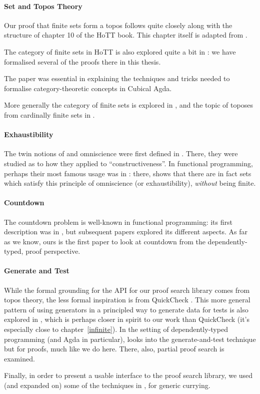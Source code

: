 \paragraph{Set and Topos Theory}
Our proof that finite sets form a topos follows quite closely along with the
structure of chapter 10 of the HoTT book.
This chapter itself is adapted from \citet{rijkeSetsHomotopyType2015}.

The category of finite sets in HoTT is also explored quite a bit in
\citet{yorgeyCombinatorialSpeciesLabelled2014}: we have formalised several of
the proofs there in this thesis.

The paper \citet{iversenUnivalentCategoriesFormalization2018} was essential in
explaining the techniques and tricks needed to formalise category-theoretic
concepts in Cubical Agda.

More generally the category of finite sets is explored in
\citet{solovevCategoryFiniteSets1983}, and the topic of toposes from cardinally
finite sets in \citet{henryToposesGeneratedCardinal2018}.
\paragraph{Exhaustibility}
The twin notions of and omniscience were first defined in
\citet{bishopFoundationsConstructiveAnalysis1967}.
There, they were studied as to how they applied to ``constructiveness''.
In functional programming, perhaps their most famous usage was in
\citet{escardoInfiniteSetsThat2013}: there,
\citeauthor{escardoInfiniteSetsThat2013} shows that there are in fact sets which
satisfy this principle of omniscience (or exhaustibility), \emph{without} being
finite.
\paragraph{Countdown}
The countdown problem is well-known in functional programming: its first
description was in \citet{huttonCountdownProblem2002}, but subsequent papers
\citep{birdCountdownCaseStudy2005, birdFunctionalPearlTrouble2003}
explored its different aspects.
As far as we know, ours is the first paper to look at countdown from the
dependently-typed, proof perspective.
\paragraph{Generate and Test}
While the formal grounding for the API for our proof search library comes from
topos theory, the less formal inspiration is from QuickCheck
\citep{claessenQuickCheckLightweightTool2011}.
This more general pattern of using generators in a principled way to generate
data for tests is also explored in \citet{runcimanSmallCheckLazySmallCheck2008},
which is perhaps closer in spirit to our work than QuickCheck (it's especially
close to chapter~\ref{infinite}).
In the setting of dependently-typed programming (and Agda in particular),
\citet{oconnorApplicationsApplicativeProof2016} looks into the generate-and-test
technique but for proofs, much like we do here.
There, also, partial proof search is examined.

Finally, in order to present a usable interface to the proof search library, we
used (and expanded on) some of the techniques in
\citet{allaisGenericLevelPolymorphic2019}, for generic currying.


